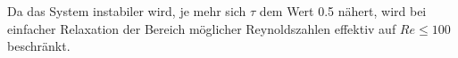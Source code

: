 \documentclass[a4paper,10pt]{scrreprt}
\begin{document}
Da das System instabiler wird, je mehr sich $\tau$ dem Wert \num{0.5} nähert, wird bei einfacher Relaxation der Bereich möglicher Reynoldszahlen effektiv auf $\mathit{Re} \leq \num{100}$ beschränkt.






















% 
\end{document}
